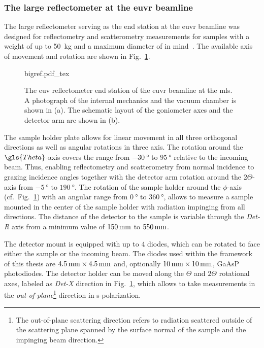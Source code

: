 \subsubsection{The large reflectometer at the \gls{euvr} beamline}
The large reflectometer serving as the end station at the \gls{euvr} beamline was designed for reflectometry and scatterometry measurements for samples with a weight of up to \SI{50}{\kg} and a maximum diameter of  in mind~\cite{tummler_characterization_2003}. The available axis of movement and rotation are shown in Fig.~\ref{ch_exp:fig_bigref}.
\begin{figure}[htb]
    \def\svgwidth{\textwidth}
    {bigref.pdf_tex}
    \caption[The EUV reflectometer end station of the EUVR beamline.]{The \gls{euv} reflectometer end station of the \gls{euvr} beamline at the \gls{mls}. A photograph of the internal mechanics and the vacuum chamber is shown in (a). The schematic layout of the goniometer axes and the detector arm are shown in (b).}
    \label{ch_exp:fig_bigref}
\end{figure}
The sample holder plate allows for linear movement in all three orthogonal directions as well as angular rotations in three axis. The rotation around the $\gls{Theta}$-axis covers the range from $\SI{-30}{\degree}$ to $\SI{95}{\degree}$ relative to the incoming beam. Thus, enabling reflectometry and scatterometry from normal incidence to grazing incidence angles together with the detector arm rotation around the $2\Theta$-axis from $\SI{-5}{\degree}$ to $\SI{190}{\degree}$. The rotation of the sample holder around the $\phi$-axis (cf.~Fig.~\ref{ch_exp:fig_bigref}) with an angular range from $\SI{0}{\degree}$ to $\SI{360}{\degree}$, allows to measure a sample mounted in the center of the sample holder with radiation impinging from all directions. The distance of the detector to the sample is variable through the \emph{Det-R} axis from a minimum value of $\mm{150}$ to $\mm{550}$.

The detector mount is equipped with up to $4$ diodes, which can be rotated to face either the sample or the incoming beam. The diodes used within the framework of this thesis are $\mm{4.5} \times \mm{4.5}$ and, optionally $\mm{10} \times \mm{10}$, GaAsP photodiodes. The detector holder can be moved along the $\Theta$ and $2\Theta$ rotational axes, labeled as \emph{Det-X} direction in Fig.~\ref{ch_exp:fig_bigref}, which allows to take measurements in the \emph{out-of-plane}\footnote{The out-of-plane scattering direction refers to radiation scattered outside of the scattering plane spanned by the surface normal of the sample and the impinging beam direction.} direction in s-polarization.

